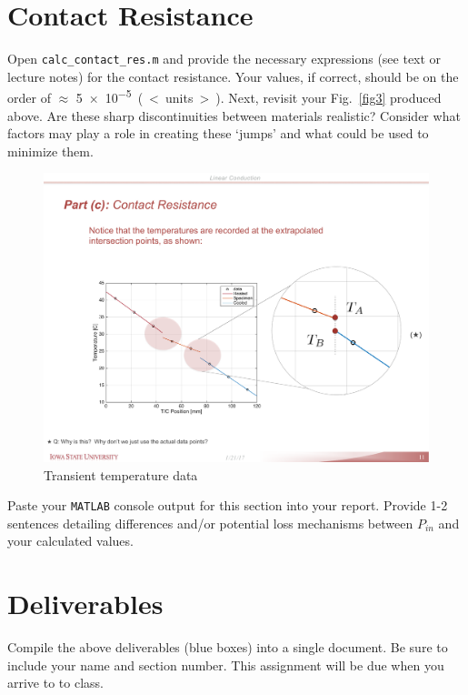 \documentclass[11pt, letterpaper]{article}
\begin{document}
\section{Contact Resistance}

Open \texttt{calc\_contact\_res.m} and provide the necessary expressions (see text or lecture notes) for the contact resistance. Your values, if correct, should be on the order of $\approx $ \SI{5e-5}{(<units>)}.
Next, revisit your Fig.~\ref{fig3} produced above. Are these sharp discontinuities between materials realistic? Consider what factors may play a role in creating these `jumps' and what could be used to minimize them.
\begin{figure}[H]
    \begin{center}
        \includegraphics[width=125mm]{gfx/fig6.pdf}
    \caption{Transient temperature data}\label{fig6}
    \end{center}
\end{figure}
\begin{formal}
    \begin{deliv}  
    Paste your \texttt{MATLAB} console output for this section into your report. Provide 1-2 sentences detailing differences and/or potential loss mechanisms between $P_{in}$ and your calculated values.
    \end{deliv}
\end{formal}
\section{Deliverables}

Compile the above deliverables (blue boxes) into a single document. Be sure to include your name and section number. This assignment will be due when you arrive to to class.
\end{document}
